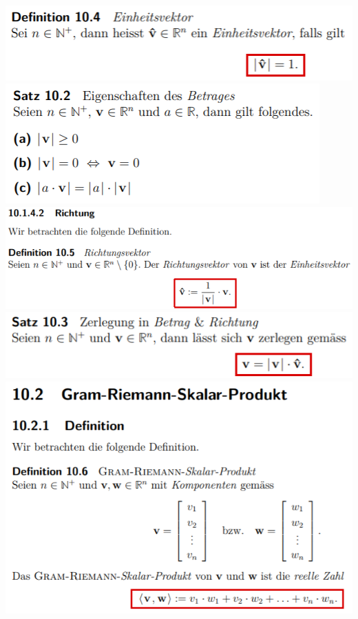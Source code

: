 \includegraphics[width=\columnwidth]{./images/vek5.png}
\includegraphics[width=\columnwidth]{./images/vek6.png}
\includegraphics[width=\columnwidth]{./images/vek7.png}
\includegraphics[width=\columnwidth]{./images/vek8.png}
\includegraphics[width=\columnwidth]{./images/vek9.png}
